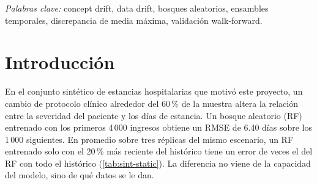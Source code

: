 \documentclass[11pt,a4paper]{article}
\begin{document}
\begin{abstract}
\noindent Un bosque aleatorio entrenado con todo el histórico promedia regímenes que ya no rigen cuando
cambia la distribución de las covariables (data drift) o la relación entre covariables y objetivo
(concept drift). Este trabajo evalúa dos ensambles de bosques aleatorios para regresión temporal: el
\texttt{DriftRegressor}, que entrena un sub-bosque por bloque temporal y los pondera por discrepancia
de media máxima (MMD) o por error reciente, y el \texttt{AdaptiveDriftForest}, una versión rediseñada a
partir del diagnóstico del primero que añade ventanas recientes anidadas, penalización por error
normalizado y reentrenamiento con los datos más recientes. La evaluación usa 11 escenarios sintéticos
y 5 conjuntos de datos reales con drift documentado, dos protocolos temporales (partición 80/20 y
walk-forward con ventana expansiva) y, como líneas base, un bosque aleatorio con todo el histórico, uno
con el 20\,\% más reciente y uno con pesos exponenciales. El \texttt{DriftRegressor} solo mejora al
bosque convencional bajo concept drift, empeora hasta en \peorDRsinConcept\,\% cuando solo hay data
drift, y es superado por la ventana reciente en \hTresRFV{} de \hTresN{} escenarios. El
\texttt{AdaptiveDriftForest} reduce el RMSE de walk-forward en los escenarios sintéticos a
\rADFeSintWalk{} veces el del bosque convencional (\gADFeSintWalk{} de 11 escenarios, Wilcoxon
$p=\pADFeSintWalk$) y a \rADFeRealWalk{} en los datos reales, donde la diferencia no es
estadísticamente distinguible con cinco conjuntos. La comparación contra líneas base de recencia
resulta indispensable para evaluar cualquier método adaptativo al drift.
\end{abstract}

\noindent\textit{Palabras clave:} concept drift, data drift, bosques aleatorios, ensambles temporales,
discrepancia de media máxima, validación walk-forward.

\newpage
\tableofcontents
\newpage

\section{Introducción}\label{sec:intro}

En el conjunto sintético de estancias hospitalarias que motivó este proyecto, un cambio de protocolo
clínico alrededor del 60\,\% de la muestra altera la relación entre la severidad del paciente y los
días de estancia. Un bosque aleatorio (RF) entrenado con los primeros 4\,000 ingresos obtiene un RMSE
de 6.40 días sobre los 1\,000 siguientes. En promedio sobre tres réplicas del mismo escenario, un RF
entrenado solo con el 20\,\% más reciente del histórico tiene un error de \xRFVHealthcareBothStatic{}
veces el del RF con todo el histórico (\cref{tab:sint-static}). La diferencia no viene de la
capacidad del modelo, sino de qué datos se le dan.
\end{document}
